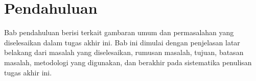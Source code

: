 \chapter{Pendahuluan}

Bab pendahuluan berisi terkait gambaran umum dan permasalahan yang  diselesaikan dalam tugas akhir ini. Bab ini dimulai dengan penjelasan latar belakang dari masalah yang diselesaikan, rumusan masalah, tujuan, batasan masalah, metodologi yang digunakan, dan berakhir pada sistematika penulisan tugas akhir ini.







